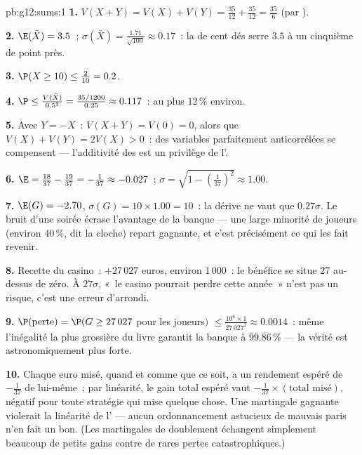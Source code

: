 \begin{solution}{pb:g12:sums:1}
\textbf{1.} $V(X + Y) = V(X) + V(Y) = \frac{35}{12} +
\frac{35}{12} = \frac{35}{6}$ (par ).

\textbf{2.} $\E(\bar X) = 3.5$~;
$\sigma(\bar X) = \frac{1.71}{\sqrt{100}} \approx 0.17$~: la
 de cent dés serre $3.5$ à un cinquième de point près.

\textbf{3.} $\P(X \geq 10) \leq \frac{2}{10} = 0.2$.

\textbf{4.} $\P \leq \frac{V(\bar X)}{0.5^2} =
\frac{35/1200}{0.25} \approx 0.117$~: au plus $12\,\%$ environ.

\textbf{5.} Avec $Y = -X$~: $V(X + Y) = V(0) = 0$, alors que
$V(X) + V(Y) = 2V(X) > 0$~: des variables parfaitement
anticorrélées se compensent --- l'additivité des  est un
privilège de l'.

\textbf{6.} $\E = \frac{18}{37} - \frac{19}{37} = -\frac{1}{37}
\approx -0.027$~;
$\sigma = \sqrt{1 - \left(\frac{1}{37}\right)^2} \approx 1.00$.

\textbf{7.} $\E(G) = -2.70$, $\sigma(G) = 10 \times 1.00 = 10$~:
la dérive ne vaut que $0.27\sigma$. Le bruit d'une soirée écrase
l'avantage de la banque --- une large minorité de joueurs (environ
$40\,\%$, dit la cloche) repart gagnante, et c'est précisément ce
qui les fait revenir.

\textbf{8.} Recette du casino~:  $+27\,027$ euros,  environ $1\,000$~: le bénéfice se situe $27$ 
au-dessus de zéro. À $27\sigma$, «~le casino pourrait perdre cette
année~» n'est pas un risque, c'est une erreur d'arrondi.

\textbf{9.} $\P(\text{perte}) = \P(G \geq 27\,027$ pour les
joueurs$)$ $\leq \frac{10^6 \times 1}{27\,027^2} \approx 0.0014$~:
même l'inégalité la plus grossière du livre garantit la banque à
$99.86\,\%$ --- la vérité est astronomiquement plus forte.

\textbf{10.} Chaque euro misé, quand et comme que ce soit, a un
rendement espéré de $-\frac{1}{37}$ de lui-même~; par linéarité, le
gain total espéré vaut $-\frac{1}{37} \times (\text{total misé})$,
négatif pour toute stratégie qui mise quelque chose. Une martingale
gagnante violerait la linéarité de l' --- aucun
ordonnancement astucieux de mauvais paris n'en fait un bon. (Les
martingales de doublement échangent simplement beaucoup de petits
gains contre de rares pertes catastrophiques.)


\end{solution}

